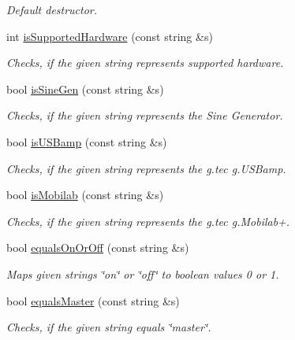 \begin{DoxyCompactItemize}
\begin{DoxyCompactList}\small\item\em Default destructor. \item\end{DoxyCompactList}\item 
int \hyperlink{class_constants_a4b37b62ba4036999ec78ee665e0fc99f}{isSupportedHardware} (const string \&s)
\begin{DoxyCompactList}\small\item\em Checks, if the given string represents supported hardware. \item\end{DoxyCompactList}\item 
bool \hyperlink{class_constants_a2a0486841708b429d3a9ba6292702dd2}{isSineGen} (const string \&s)
\begin{DoxyCompactList}\small\item\em Checks, if the given string represents the Sine Generator. \item\end{DoxyCompactList}\item 
bool \hyperlink{class_constants_a9783854161bd324f9aa14f66d460b7a5}{isUSBamp} (const string \&s)
\begin{DoxyCompactList}\small\item\em Checks, if the given string represents the g.tec g.USBamp. \item\end{DoxyCompactList}\item 
bool \hyperlink{class_constants_ac68da3efa9f4431daedf508f0577049e}{isMobilab} (const string \&s)
\begin{DoxyCompactList}\small\item\em Checks, if the given string represents the g.tec g.Mobilab+. \item\end{DoxyCompactList}\item 
bool \hyperlink{class_constants_aacd7600c3d6c2dcdd3b6d2740de1c7bd}{equalsOnOrOff} (const string \&s)
\begin{DoxyCompactList}\small\item\em Maps given strings \char`\"{}on\char`\"{} or \char`\"{}off\char`\"{} to boolean values 0 or 1. \item\end{DoxyCompactList}\item 
bool \hyperlink{class_constants_a9a808751c766b2f77cc13362b2064d76}{equalsMaster} (const string \&s)
\begin{DoxyCompactList}\small\item\em Checks, if the given string equals \char`\"{}master\char`\"{}. \item\end{DoxyCompactList}\item 

\end{DoxyCompactItemize}
